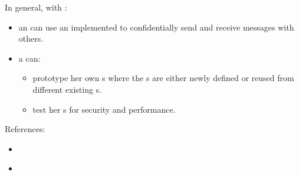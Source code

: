 In general, with \cry:
\begin{itemize}
\item an \eu{} can use an implemented \cs{}
  to confidentially send and receive messages with others.
\item a \cg{} can:
  \begin{itemize}
  \item prototype her own \cs s
    where the \ca s are either newly defined
    or reused from different existing \cs s.
  \item test her \cs s for security and performance.
  \end{itemize}
\end{itemize}


References:
\begin{itemize}
\item \cite{Cryptosystem}
\item \cite{RSA}
\end{itemize}
